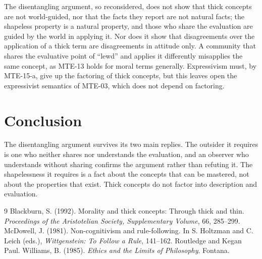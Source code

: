 \documentclass{situationist-preprint}
\begin{document}
The disentangling argument, so reconsidered, does not show that thick concepts are not world-guided, nor that the facts they report are not natural facts; the shapeless property is a natural property, and those who share the evaluation are guided by the world in applying it. Nor does it show that disagreements over the application of a thick term are disagreements in attitude only. A community that shares the evaluative point of \enquote{lewd} and applies it differently misapplies the same concept, as MTE-13 holds for moral terms generally. Expressivism must, by MTE-15-a, give up the factoring of thick concepts, but this leaves open the expressivist semantics of MTE-03, which does not depend on factoring.

\section{Conclusion}

The disentangling argument survives its two main replies. The outsider it requires is one who neither shares nor understands the evaluation, and an observer who understands without sharing confirms the argument rather than refuting it. The shapelessness it requires is a fact about the concepts that can be mastered, not about the properties that exist. Thick concepts do not factor into description and evaluation.

\begin{thebibliography}{9}\small
{} Blackburn, S. (1992). Morality and thick concepts: Through thick and thin. \emph{Proceedings of the Aristotelian Society, Supplementary Volume}, 66, 285--299.
 McDowell, J. (1981). Non-cognitivism and rule-following. In S. Holtzman and C. Leich (eds.), \emph{Wittgenstein: To Follow a Rule}, 141--162. Routledge and Kegan Paul.
 Williams, B. (1985). \emph{Ethics and the Limits of Philosophy}. Fontana.
\end{thebibliography}
\end{document}
